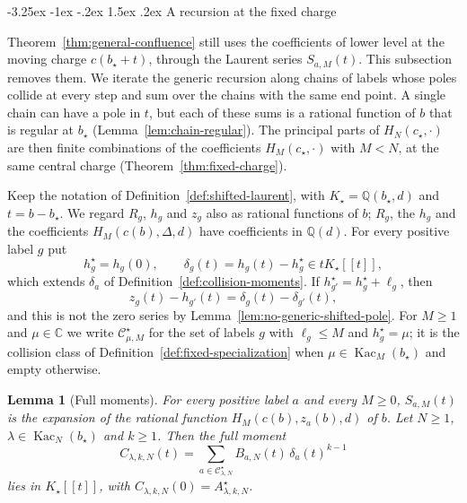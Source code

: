 \documentclass[twoside,10pt]{article}
\makeatletter
\numberwithin{equation}{section}
\theoremstyle{slbody}
\newtheorem{lemma}[theorem]{Lemma}
\theoremstyle{definition}
\theoremstyle{remark}
\renewcommand{\subsection}{%
  \@startsection{subsection}{2}{\z@}%
    {-3.25ex \@plus -1ex \@minus -.2ex}%
    {1.5ex \@plus .2ex}%
    {\normalfont\normalsize\bfseries}}
\makeatother
\begin{document}
\subsection{A recursion at the fixed charge}\label{sec:fixed-charge}

Theorem~\ref{thm:general-confluence} still uses the coefficients of lower
level at the moving charge $c(b_\star+t)$, through the Laurent series
$S_{a,M}(t)$.  This subsection removes them.  We iterate the generic
recursion along chains of labels whose poles collide at every step and sum
over the chains with the same end point.  A single chain can have a pole in
$t$, but each of these sums is a rational function of $b$ that is regular at
$b_\star$ (Lemma~\ref{lem:chain-regular}).  The principal parts of
$H_N(c_\star,\cdot)$ are then finite combinations of the coefficients
$H_M(c_\star,\cdot)$ with $M<N$, at the same central charge
(Theorem~\ref{thm:fixed-charge}).

Keep the notation of Definition~\ref{def:shifted-laurent}, with
$K_\star=\mathbb Q(b_\star,d)$ and $t=b-b_\star$.  We regard $R_g$, $h_g$ and
$z_g$ also as rational functions of $b$; $R_g$, the $h_g$ and the coefficients
$H_M(c(b),\Delta,d)$ have coefficients in $\mathbb Q(d)$.  For every positive
label $g$ put
\[
 h^\star_g=h_g(0),\qquad \delta_g(t)=h_g(t)-h^\star_g\in tK_\star[[t]],
\]
which extends $\delta_a$ of Definition~\ref{def:collision-moments}.  If
$h^\star_{g'}=h^\star_g+\ell_g$, then
\begin{equation}\label{eq:link}
 z_g(t)-h_{g'}(t)=\delta_g(t)-\delta_{g'}(t),
\end{equation}
and this is not the zero series by Lemma~\ref{lem:no-generic-shifted-pole}.
For $M\geq1$ and $\mu\in\mathbb C$ we write ${\mathcal C}^\star_{\mu,M}$ for
the set of labels $g$ with $\ell_g\leq M$ and $h^\star_g=\mu$; it is the collision
class of Definition~\ref{def:fixed-specialization} when
$\mu\in\operatorname{Kac}_M(b_\star)$ and empty otherwise.

\begin{lemma}[Full moments]\label{lem:full-moments}
For every positive label $a$ and every $M\geq0$, $S_{a,M}(t)$ is the
expansion of the rational function $H_M(c(b),z_a(b),d)$ of $b$.  Let
$N\geq1$, $\lambda\in\operatorname{Kac}_N(b_\star)$ and $k\geq1$.  Then the
full moment
\[
 C_{\lambda,k,N}(t)=\sum_{a\in{\mathcal C}^\star_{\lambda,N}}B_{a,N}(t)\,\delta_a(t)^{k-1}
\]
lies in $K_\star[[t]]$, with $C_{\lambda,k,N}(0)=A^\star_{\lambda,k,N}$.
\end{lemma}
\end{document}
